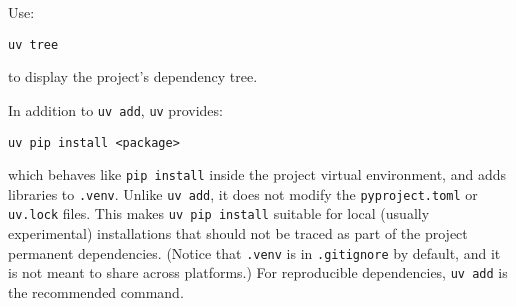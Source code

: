 Use:
\begin{lstlisting}
uv tree
\end{lstlisting}
to display the project’s dependency tree.

In addition to \verb|uv add|, \verb|uv| provides:
\begin{lstlisting}
uv pip install <package>
\end{lstlisting}
which behaves like \verb|pip install| inside the project virtual environment, and adds libraries to \verb|.venv|. Unlike \verb|uv add|, it does not modify the \verb|pyproject.toml| or \verb|uv.lock| files. This makes \verb|uv pip install| suitable for local (usually experimental) installations that should not be traced as part of the project permanent dependencies. (Notice that \verb|.venv| is in \verb|.gitignore| by default, and it is not meant to share across platforms.) For reproducible dependencies, \verb|uv add| is the recommended command.
